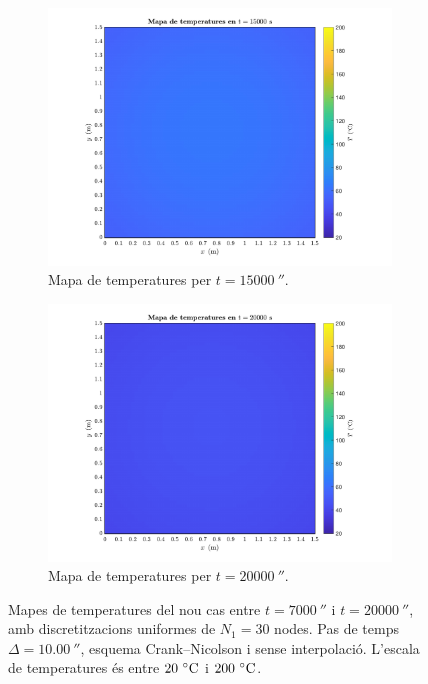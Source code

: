 \begin{figure}[ht]
\begin{subfigure}{.5\textwidth}
		\includegraphics[width=.95\linewidth]{imagenes/06_canvi_condicions_contorn/t_15000.pdf}
		\vspace{-10pt}
		\caption{Mapa de temperatures per $t = 15000 \ \second$.}
		\label{fig:nou_t_15000}
	\end{subfigure}%
	\begin{subfigure}{.5\textwidth}
		\centering
		\includegraphics[width=.95\linewidth]{imagenes/06_canvi_condicions_contorn/t_20000.pdf}
		\vspace{-10pt}
		\caption{Mapa de temperatures per $t = 20000 \ \second$.}
		\label{fig:nou_t_20000}
	\end{subfigure}
	\caption{Mapes de temperatures del nou cas entre $t = 7000 \ \second$ i $t = 20000 \ \second$, amb discretitzacions uniformes de $N_1 = 30$ nodes. Pas de temps $\Delta = 10.00 \ \second$, esquema Crank--Nicolson i sense interpolació. L'escala de temperatures és entre $20 \ \celsius$ i $200 \ \celsius$.}
	\label{fig:nous_2}
\end{figure} 

